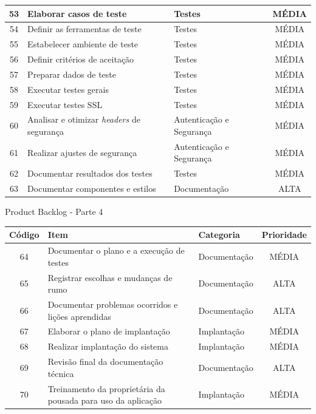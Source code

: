 \documentclass[
	12pt,				%
	openany,			%
	twoside,			%
	a4paper,			%
	english,			%
	french,				%
	spanish,			%
	brazil				%
	]{abntex2}
\begin{document}
\begin{quadro}[H]
\begin{tabular}{|c|p{6.5cm}|p{3.8cm}|c|}
     		53 & Elaborar casos de teste & Testes & MÉDIA \\ \hline
	     	54 & Definir as ferramentas de teste & Testes &	MÉDIA \\ \hline
	     	55 & Estabelecer ambiente de teste & Testes & MÉDIA \\ \hline
	     	56 & Definir critérios de aceitação & Testes & MÉDIA \\ \hline
	     	57 & Preparar dados de teste & Testes &	MÉDIA \\ \hline
	     	58 & Executar testes gerais & Testes & MÉDIA \\ \hline
	     	59 & Executar testes SSL & Testes &	MÉDIA \\ \hline
	     	60 & Analisar e otimizar \textit {headers} de segurança &
	     	Autenticação e Segurança &	MÉDIA \\ \hline	
	     	61 & Realizar ajustes de segurança & Autenticação e Segurança
	     	& MÉDIA \\ \hline
	     	62 & Documentar resultados dos testes &	Testes & MÉDIA \\ \hline
	     	63 & Documentar componentes e estilos & Documentação &
	     	ALTA \\ \hline
     	\end{tabular}
     		\end{quadro}

 \begin{quadro}[H]
	\caption{Product Backlog - Parte 4}
	\label{product_backlog_4}
	\begin{tabular}{|c|p{6.5cm}|p{3.8cm}|c|}
		\hline
		\textbf{Código} & \textbf{Item} & \textbf{Categoria} & \textbf{Prioridade} \\	\hline
		   64 & Documentar o plano e a execução de testes & Documentação &
		   MÉDIA \\ \hline
		   65 & Registrar escolhas e mudanças de rumo & Documentação &
		   ALTA \\ \hline
		   66 & Documentar problemas ocorridos e lições aprendidas &
		   Documentação & ALTA \\ \hline
		   67 & Elaborar o plano de implantação & Implantação & 
		   MÉDIA \\ \hline
		   68 & Realizar implantação do sistema & Implantação & MÉDIA \\ \hline
		   69 & Revisão final da documentação técnica & Documentação &
		   ALTA \\ \hline
		   70 & Treinamento da proprietária da pousada para uso da aplicação &	Implantação & MÉDIA \\ \hline
   \end{tabular}
\end{quadro}
\end{document}
